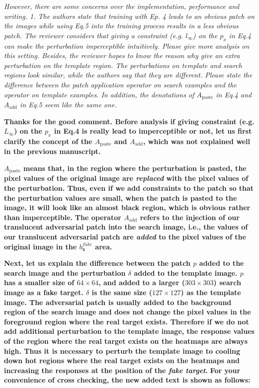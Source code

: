 \documentclass[12pt]{article}
\newcommand{\ie}{i.e.}
\begin{document}
\textit{However, there are some concerns over the implementation, performance and writing. 1. The authors state that training with Ep. 4 leads to an obvious patch on the images while using Eq.5 into the training process results in a less obvious patch. The reviewer considers that giving a constraint (e.g. $l_{\infty}$) on the $p_x$ in Eq.4 can make the perturbation imperceptible intuitively. Please give more analysis on this setting.
Besides, the reviewer hopes to know the reason why give an extra perturbation on the template region. The perturbations on template and search regions look similar, while the authors say that they are different. Please state the difference between the patch application operator on search examples and the operator on template examples.
In addition, the denotations of $A_{\text{paste}}$ in Eq.4 and $A_{\text{add}}$ in Eq.5 seem like the same one.
}

\textbf{
Thanks for the good comment.
Before analysis if giving constraint (e.g. $L_{\infty}$) on the $p_x$ in Eq.4 is really lead to imperceptible or not, let us first clarify the concept of the $A_{\text{paste}}$ and $A_{\text{add}}$, which was not explained well in the previous manuscript.}

\textbf{
$A_{\text{paste}}$ means that, in the region where the perturbation is pasted, the pixel values of the original image are \textit{replaced} with the pixel values of the perturbation.
Thus, even if we add constraints to the patch so that the perturbation values are small, when the patch is pasted to the image, it will look like an almost black region, which is obvious rather than imperceptible.}
\textbf{The operator $A_\text{add}$ refers to the injection of our translucent adversarial patch into the search image, \ie, the values of our translucent adversarial patch are \textit{added} to the pixel values of the original image in the $b^{fake}_{\textbf{x}}$ area.
}

\textbf{Next, let us explain the difference between the patch $p$ added to the search image and the perturbation $\delta$ added to the template image. $p$ has a smaller size of $64\times 64$, and added to a larger ($303\times 303$) search image as a fake target.
$\delta$ is the same size ($127\times 127$) as the template image.
The adversarial patch is usually added to the background region of the search image and does not change the pixel values in the foreground region where the real target exists. Therefore if we do not add additional perturbation to the template image, the response values of the region where the real target exists on the heatmaps are always high. Thus it is necessary to perturb the template image to cooling down hot regions where the real target exists on the heatmaps and increasing the responses at the position of the \textit{fake target}.
}
\textbf{For your convenience of cross checking, the new added text is shown as follows:}
\end{document}
